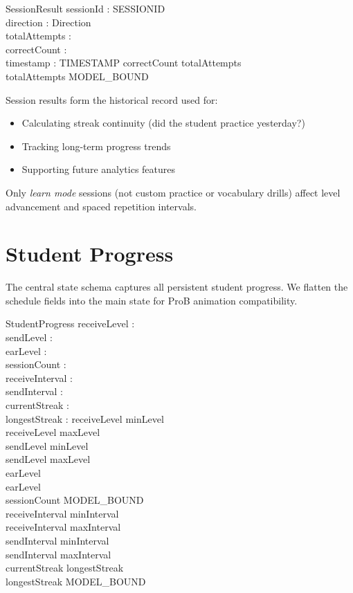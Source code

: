 \documentclass[a4paper,10pt,fleqn]{article}
\begin{document}
\begin{schema}{SessionResult}
sessionId : SESSIONID \\
direction : Direction \\
totalAttempts : \nat \\
correctCount : \nat \\
timestamp : TIMESTAMP
\where
correctCount \leq totalAttempts \\
totalAttempts \leq MODEL\_BOUND
\end{schema}

Session results form the historical record used for:
\begin{itemize}
\item Calculating streak continuity (did the student practice yesterday?)
\item Tracking long-term progress trends
\item Supporting future analytics features
\end{itemize}

Only \emph{learn mode} sessions (not custom practice or vocabulary drills)
affect level advancement and spaced repetition intervals.

\section{Student Progress}

The central state schema captures all persistent student progress. We flatten
the schedule fields into the main state for ProB animation compatibility.

\begin{schema}{StudentProgress}
receiveLevel : \nat \\
sendLevel : \nat \\
earLevel : \nat \\
sessionCount : \nat \\
receiveInterval : \nat \\
sendInterval : \nat \\
currentStreak : \nat \\
longestStreak : \nat
\where
receiveLevel \geq minLevel \\
receiveLevel \leq maxLevel \\
sendLevel \geq minLevel \\
sendLevel \leq maxLevel \\
earLevel  \\
earLevel  \\
sessionCount \leq MODEL\_BOUND \\
receiveInterval \geq minInterval \\
receiveInterval \leq maxInterval \\
sendInterval \geq minInterval \\
sendInterval \leq maxInterval \\
currentStreak \leq longestStreak \\
longestStreak \leq MODEL\_BOUND
\end{schema}
\end{document}
